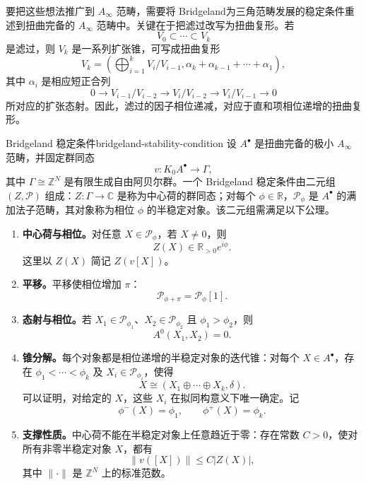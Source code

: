 要把这些想法推广到 $A_\infty$ 范畴，需要将 Bridgeland为三角范畴发展的稳定条件重述到扭曲完备的 $A_\infty$ 范畴中。关键在于把滤过改写为扭曲复形。若
\[
  V_0\subset\cdots\subset V_k
\]
是滤过，则 $V_k$ 是一系列扩张锥，可写成扭曲复形
\[
  V_k=\left(\bigoplus_{i=1}^k V_i/V_{i-1},
  \alpha_k+\alpha_{k-1}+\cdots+\alpha_1\right),
\]
其中 $\alpha_i$ 是相应短正合列
\[
  0\longrightarrow V_{i-1}/V_{i-2}
  \longrightarrow V_i/V_{i-2}
  \longrightarrow V_i/V_{i-1}\longrightarrow0
\]
所对应的扩张态射。因此，滤过的因子相位递减，对应于直和项相位递增的扭曲复形。

\begin{definition}{Bridgeland 稳定条件}{bridgeland-stability-condition}
设 $A^{\bullet}$ 是扭曲完备的极小 $A_\infty$ 范畴，并固定群同态
\[
  v\colon K_0A^{\bullet}\longrightarrow\Gamma,
\]
其中 $\Gamma\cong\mathbb Z^N$ 是有限生成自由阿贝尔群。一个 Bridgeland 稳定条件由二元组 $(Z,\mathcal P)$ 组成：$Z\colon\Gamma\to\mathbb C$ 是称为中心荷的群同态；对每个 $\phi\in\mathbb R$，$\mathcal P_\phi$ 是 $A^{\bullet}$ 的满加法子范畴，其对象称为相位 $\phi$ 的半稳定对象。该二元组需满足以下公理。
\begin{enumerate}[label=(SC\arabic*)]
  \item \textbf{中心荷与相位。}对任意 $X\in\mathcal P_\phi$，若 $X\ne0$，则
  \[
    Z(X)\in\mathbb R_{>0}e^{i\phi}.
  \]
  这里以 $Z(X)$ 简记 $Z(v[X])$。
  \item \textbf{平移。}平移使相位增加 $\pi$：
  \[
    \mathcal P_{\phi+\pi}=\mathcal P_\phi[1].
  \]
  \item \textbf{态射与相位。}若 $X_1\in\mathcal P_{\phi_1}$、$X_2\in\mathcal P_{\phi_2}$ 且 $\phi_1>\phi_2$，则
  \[
    A^0(X_1,X_2)=0.
  \]
  \item \textbf{锥分解。}每个对象都是相位递增的半稳定对象的迭代锥：对每个 $X\in A^{\bullet}$，存在 $\phi_1<\cdots<\phi_k$ 及 $X_i\in\mathcal P_{\phi_i}$，使得
  \[
    X\cong(X_1\oplus\cdots\oplus X_k,\delta).
  \]
  可以证明，对给定的 $X$，这些 $X_i$ 在拟同构意义下唯一确定。记
  \[
    \phi^-(X)=\phi_1,\qquad\phi^+(X)=\phi_k.
  \]
  \item \textbf{支撑性质。}中心荷不能在半稳定对象上任意趋近于零：存在常数 $C>0$，使对所有非零半稳定对象 $X$，都有
  \[
    \|v([X])\|\le C|Z(X)|,
  \]
  其中 $\|\cdot\|$ 是 $\mathbb Z^N$ 上的标准范数。
\end{enumerate}
\end{definition}

